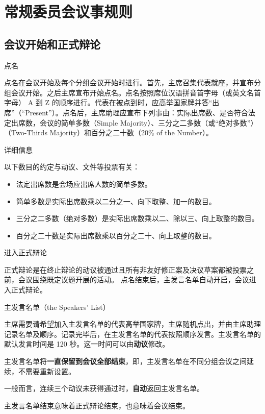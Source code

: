 \documentclass{beamer}
\begin{document}
\section{常规委员会议事规则}

\subsection{会议开始和正式辩论}

\begin{frame}{点名}

点名在会议开始及每个分组会议开始时进行。首先，主席召集代表就座，并宣布分组会议开始。之后主席宣布开始点名。点名按照席位汉语拼音首字母（或英文名首字母） A 到 Z 的顺序进行。代表在被点到时，应高举国家牌并答“出席”（“Present”）。点名后，主席助理应宣布下列事由：实际出席数、是否符合法定出席数，会议的简单多数（Simple Majority）、三分之二多数（或“绝对多数”）（Two-Thirds Majority）和百分之二十数（20\% of the Number）。

\end{frame}

\begin{frame}{详细信息}

以下数目的约定与动议、文件等投票有关：

\begin{itemize}
\item 法定出席数是会场应出席人数的简单多数。
\item 简单多数是实际出席数乘以二分之一、向下取整、加一的数目。
\item 三分之二多数（绝对多数）是实际出席数乘以二、除以三、向上取整的数目。
\item 百分之二十数是实际出席数乘以百分之二十、向上取整的数目。
\end{itemize}

\end{frame}

\begin{frame}{进入正式辩论}

正式辩论是在终止辩论的动议被通过且所有非友好修正案及决议草案都被投票之前，会议围绕既定议题开展的活动。
点名结束后，主发言名单自动开启，会议进入正式辩论。

\end{frame}

\begin{frame}{主发言名单（the Speakers’ List）}

主席需要请希望加入主发言名单的代表高举国家牌，主席随机点出，并由主席助理记录名单及顺序。记录完毕后，在主发言名单的代表按照顺序发言。主发言名单的默认发言时间是 120 秒。这一时间可以由\textbf{动议}修改。

主发言名单将\textbf{一直保留到会议全部结束}，即，主发言名单在不同分组会议之间延续，不需要重新设置。

一般而言，连续三个动议未获得通过时，\textbf{自动}返回主发言名单。

主发言名单结束意味着正式辩论结束，也意味着会议结束。

\end{frame}
\end{document}
